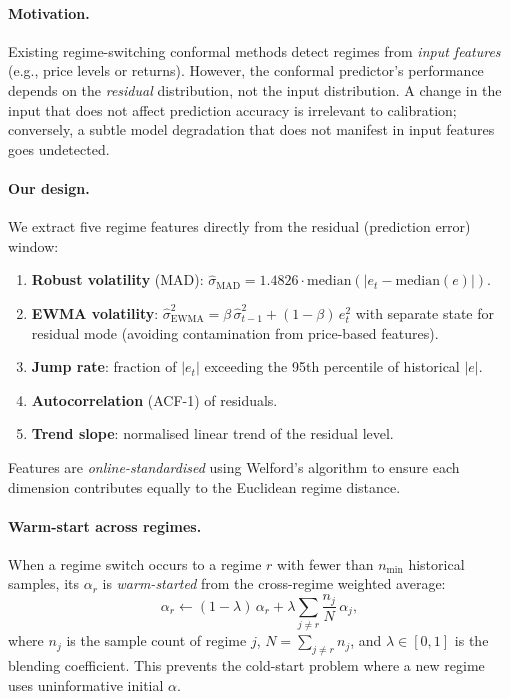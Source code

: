 \paragraph{Motivation.}
Existing regime-switching conformal methods detect regimes from
\emph{input features} (e.g., price levels or returns).  However, the
conformal predictor's performance depends on the \emph{residual}
distribution, not the input distribution.  A change in the input that does
not affect prediction accuracy is irrelevant to calibration; conversely,
a subtle model degradation that does not manifest in input features goes
undetected.

\paragraph{Our design.}
We extract five regime features directly from the residual (prediction
error) window:
\begin{enumerate}
  \item \textbf{Robust volatility} (MAD): $\hat{\sigma}_{\mathrm{MAD}} =
    1.4826 \cdot \mathrm{median}(|e_t - \mathrm{median}(e)|)$.
  \item \textbf{EWMA volatility}: $\hat{\sigma}_{\mathrm{EWMA}}^2 =
    \beta\,\hat{\sigma}_{t-1}^2 + (1-\beta)\,e_t^2$ with separate state
    for residual mode (avoiding contamination from price-based features).
  \item \textbf{Jump rate}: fraction of $|e_t|$ exceeding the 95th
    percentile of historical $|e|$.
  \item \textbf{Autocorrelation} (ACF-1) of residuals.
  \item \textbf{Trend slope}: normalised linear trend of the residual
    level.
\end{enumerate}
Features are \emph{online-standardised} using Welford's algorithm to
ensure each dimension contributes equally to the Euclidean regime distance.

\paragraph{Warm-start across regimes.}
When a regime switch occurs to a regime $r$ with fewer than
$n_{\min}$ historical samples, its $\alpha_r$ is \emph{warm-started}
from the cross-regime weighted average:
\begin{equation}\label{eq:warmstart}
  \alpha_r \leftarrow (1-\lambda)\,\alpha_r
    + \lambda \sum_{j \ne r} \frac{n_j}{N}\,\alpha_j,
\end{equation}
where $n_j$ is the sample count of regime $j$, $N = \sum_{j\ne r} n_j$,
and $\lambda \in [0,1]$ is the blending coefficient.  This prevents the
cold-start problem where a new regime uses uninformative initial $\alpha$.

